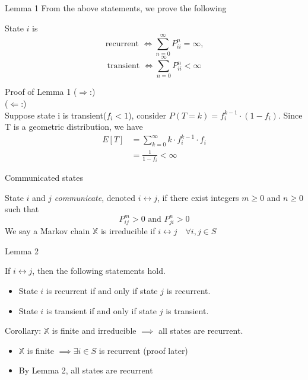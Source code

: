 \documentclass[mathserif]{beamer}
\begin{document}
\begin{frame}{Lemma 1}
	From the above statements, we prove the following
	\begin{lemma}
	State $i$ is 
	\[
	\text{recurrent } \iff \sum_{n=0}^\infty P^n_{ii} = \infty \text{,}
	\]
	\[
	\text{transient } \iff \sum_{n=0}^\infty P^n_{ii} < \infty
	\]
	\end{lemma}
\end{frame}

\begin{frame}{Proof of Lemma 1}
	($\Rightarrow$:)\\
	($\Leftarrow$:)\\
	Suppose state i is transient($f_i < 1$), consider $P(T=k) = f_i^{k-1} \cdot (1-f_i)$. Since T is a geometric distribution, we have
	\begin{align*}
		E[T] 	&= \sum_{k = 0}^\infty k \cdot f_i^{k-1} \cdot f_i \\
			&=\frac{1}{1-f_i} < \infty
	\end{align*}
\end{frame}

\begin{frame}{Communicated states}
	\begin{definition}
	State $i$ and $j$ \textit{communicate}, denoted $i \leftrightarrow j$,
	if there exist integers $m \geq 0$ and $n \geq 0$ such that
	\[
	P^m_{ij} > 0 \text{ and } P^n_{ji} > 0
	\]
	We say a Markov chain $\mathbb{X}$ is irreducible if $i \leftrightarrow j \quad \forall i, j \in S$
	\end{definition}
\end{frame}

\begin{frame}{Lemma 2}
	\begin{lemma}
	If $i \leftrightarrow j$, then the following statements hold.
	\begin{itemize}
	\item State $i$ is recurrent if and only if state $j$ is recurrent.
	\item State $i$ is transient if and only if state $j$ is transient.
	\end{itemize}
	Corollary: $\mathbb{X}$ is finite and irreducible $\implies$ all states are recurrent.
	\begin{itemize}
	\item $\mathbb{X}$ is finite $\implies \exists i \in S$ is recurrent (proof later)
	\item By Lemma 2, all states are recurrent
	\end{itemize}
	\end{lemma}
\end{frame}
\end{document}
